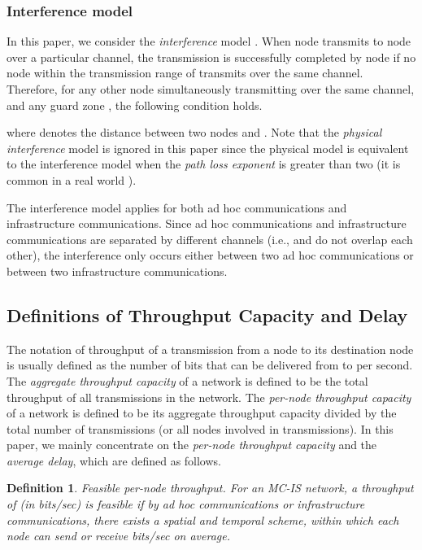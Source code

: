 \documentclass[10pt,journal]{IEEEtran}
\newtheorem{definition}{Definition}
\begin{document}
\subsubsection{Interference model}
In this paper, we consider the \textit{interference} model \cite{Gupta:Kumar,bliu:infocom2003,Kozat:mobicom2003,Kyasanur:mobicom2005,Zemlianov:jsac05,panli:jsac09}. When node  transmits to node  over a particular channel, the transmission is successfully completed by node  if no node within the transmission range of  transmits over the same channel. Therefore, for any other node  simultaneously transmitting over the same channel, and any guard zone , the following condition holds.

where  denotes the distance between two nodes  and . Note that the \textit{physical interference} model \cite{Gupta:Kumar} is ignored in this paper since the physical model is equivalent to the interference model when the \textit{path loss exponent} is greater than two (it is common in a real world \cite{Gupta:Kumar,Rappaport:2002}).

The interference model applies for both ad hoc communications and infrastructure communications. Since ad hoc communications and infrastructure communications are separated by different channels (i.e.,  and  do not overlap each other), the interference only occurs either between two ad hoc communications or between two infrastructure communications. 

\subsection{Definitions of Throughput Capacity and Delay}
\label{subsec:definitions}
The notation of throughput of a transmission from a node  to its destination node  is usually defined as the number of bits that can be delivered from  to  per second. The \textit{aggregate throughput capacity} of a network is defined to be the total throughput of all transmissions in the network. The \textit{per-node throughput capacity} of a network is defined to be its aggregate throughput capacity divided by the total number of transmissions (or all nodes involved in transmissions). In this paper, we mainly concentrate on the \textit{per-node throughput capacity} and the \textit{average delay}, which are defined as follows. 

\begin{definition}
\textit{Feasible per-node throughput}. For an \textit{MC-IS} network, a throughput of  (in bits/sec) is \textit{feasible} if by ad hoc communications or infrastructure communications, there exists a \textit{spatial and temporal scheme}, within which each node can send or receive  bits/sec on average. 
\end{definition} 
\end{document}
